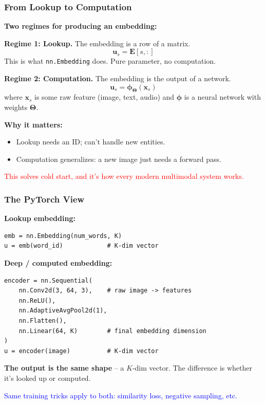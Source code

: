 \documentclass[notes,11pt, aspectratio=169]{beamer}
\newcommand{\vu}{\mathbf{u}}
\newcommand{\vx}{\mathbf{x}}
\newcommand{\vE}{\mathbf{E}}
\newcommand{\vTheta}{\boldsymbol{\Theta}}
\newcommand{\vphi}{\boldsymbol{\phi}}
\begin{document}
\begin{frame}
\frametitle{From Lookup to Computation}

\textbf{Two regimes for producing an embedding:}

\vspace{6pt}
\textbf{Regime 1: Lookup.} The embedding is a row of a matrix.
\[
    \vu_s = \vE[s, :]
\]
This is what \texttt{nn.Embedding} does. Pure parameter, no computation.

\vspace{8pt}
\textbf{Regime 2: Computation.} The embedding is the output of a network.
\[
    \vu_s = \vphi_{\vTheta}(\vx_s)
\]
where $\vx_s$ is some raw feature (image, text, audio) and $\vphi$ is a neural network with weights $\vTheta$.

\vspace{8pt}
\textbf{Why it matters:}
\begin{itemize}
    \item Lookup needs an ID; can't handle new entities.
    \item Computation generalizes: a new image just needs a forward pass.
\end{itemize}

\textcolor{red}{This solves cold start, and it's how every modern multimodal system works.}
\end{frame}

\begin{frame}[fragile]
\frametitle{The PyTorch View}

\textbf{Lookup embedding:}
\begin{lstlisting}
emb = nn.Embedding(num_words, K)
u = emb(word_id)            # K-dim vector
\end{lstlisting}

\vspace{6pt}
\textbf{Deep / computed embedding:}
\begin{lstlisting}
encoder = nn.Sequential(
    nn.Conv2d(3, 64, 3),    # raw image -> features
    nn.ReLU(),
    nn.AdaptiveAvgPool2d(1),
    nn.Flatten(),
    nn.Linear(64, K)        # final embedding dimension
)
u = encoder(image)          # K-dim vector
\end{lstlisting}

\vspace{6pt}
\textbf{The output is the same shape} -- a $K$-dim vector. The difference is whether it's looked up or computed.

\vspace{4pt}
\textcolor{blue}{Same training tricks apply to both: similarity loss, negative sampling, etc.}
\end{frame}
\end{document}
